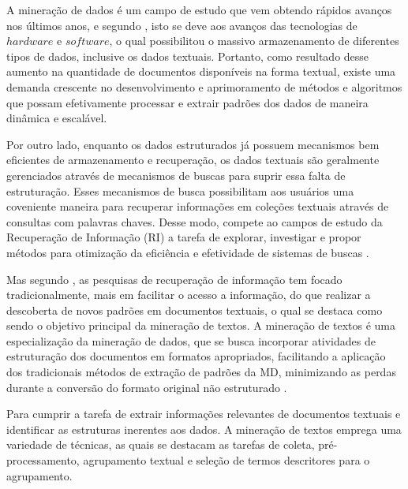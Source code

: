 A mineração de dados é um campo de estudo que vem obtendo rápidos avanços nos últimos anos, e
segundo , isto se deve aos avanços das tecnologias de $hardware$ e
$software$, o qual possibilitou o massivo armazenamento de diferentes tipos de dados, inclusive os
dados textuais. Portanto, como resultado desse aumento na quantidade de documentos disponíveis na
forma textual, existe uma demanda crescente no desenvolvimento e aprimoramento de métodos e
algoritmos que possam efetivamente processar e extrair padrões dos dados de maneira dinâmica e
escalável. 

Por outro lado, enquanto os dados estruturados já possuem mecanismos bem eficientes de armazenamento
e recuperação, os dados textuais são geralmente gerenciados através de mecanismos de buscas para
suprir essa falta de estruturação. Esses mecanismos de busca possibilitam aos usuários uma
coveniente maneira para recuperar informações em coleções textuais através de consultas com palavras
chaves. Desse modo, compete ao campos de estudo da Recuperação de Informação (RI) a tarefa de
explorar, investigar e propor métodos para otimização da eficiência e efetividade de
sistemas de buscas \cite{Baeza2011}. 

Mas segundo , as pesquisas de recuperação de informação tem focado
tradicionalmente, mais em facilitar o acesso a informação, do que realizar a descoberta de novos
padrões em documentos textuais, o qual se destaca como sendo o objetivo principal da mineração de
textos. A mineração de textos é uma especialização da mineração de dados, que se busca incorporar
atividades de estruturação dos documentos em formatos apropriados, facilitando a aplicação dos
tradicionais métodos de extração de padrões da MD, minimizando as perdas durante a conversão do
formato original não estruturado \cite{Nogueira2013}.


Para cumprir a tarefa de extrair informações relevantes de documentos textuais e identificar as
estruturas inerentes aos dados. A mineração de textos emprega uma variedade de técnicas, as quais se
destacam as tarefas de coleta, pré-processamento, agrupamento textual e seleção de termos
descritores para o agrupamento. 

